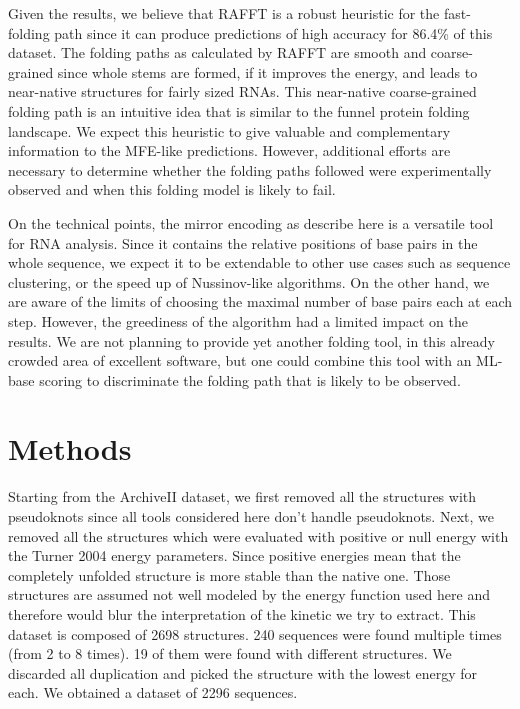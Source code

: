 \documentclass[a4paper,12pt]{article}
\begin{document}
Given the results, we believe that RAFFT is a robust heuristic for the
fast-folding path since it can produce predictions of high accuracy for 86.4\% of
this dataset. The folding paths as calculated by RAFFT are smooth and
coarse-grained since whole stems are formed, if it improves the energy, and
leads to near-native structures for fairly sized RNAs. This near-native
coarse-grained folding path is an intuitive idea that is similar to the funnel
protein folding landscape. We expect this heuristic to give valuable and
complementary information to the MFE-like predictions. However, additional
efforts are necessary to determine whether the folding paths followed were
experimentally observed and when this folding model is likely to fail.

On the technical points, the mirror encoding as describe here is a versatile
tool for RNA analysis. Since it contains the relative positions of base pairs in
the whole sequence, we expect it to be extendable to other use cases such as
sequence clustering, or the speed up of Nussinov-like algorithms. On the other
hand, we are aware of the limits of choosing the maximal number of base pairs
each at each step. However, the greediness of the algorithm had a limited impact
on the results. We are not planning to provide yet another folding tool, in this
already crowded area of excellent software, but one could combine this tool with
an ML-base scoring to discriminate the folding path that is likely to be
observed.

\section*{Methods}
\label{sec:orgea51452}
Starting from the ArchiveII dataset, we first removed all the structures with
pseudoknots since all tools considered here don't handle pseudoknots. Next, we
removed all the structures which were evaluated with positive or null energy
with the Turner 2004 energy parameters. Since positive energies mean that the
completely unfolded structure is more stable than the native one. Those
structures are assumed not well modeled by the energy function used here and
therefore would blur the interpretation of the kinetic we try to extract. This
dataset is composed of 2698 structures. 240 sequences were found multiple times
(from 2 to 8 times). 19 of them were found with different structures. We
discarded all duplication and picked the structure with the lowest energy for
each. We obtained a dataset of 2296 sequences.
\end{document}
